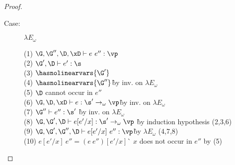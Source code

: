 \begin{proof}
\begin{description}
\item[Case:] $\lambda E_\omega$
\begin{tabbing}
    (1) $\G, \G'', \D, \xD \vdash e~e'' : \vp$\\
    (2) $\G', \D \vdash e' : \s$\\
    (3) $\hasnolinearvars{\G'}$\\
    (4) $\hasnolinearvars{\G''}$\` by inv. on $\lambda E_\omega$\\
    (5) $\D$ cannot occur in $e''$\\
    (6) $\G, \D, \xD \vdash e : \s' \to_\omega \vp$\` by inv. on $\lambda E_\omega$\\
    (7) $\G'' \vdash e'' : \s'$ \` by inv. on $\lambda E_\omega$\\
    (8) $\G, \G', \D \vdash e[e'/x] : \s' \to_\omega \vp$ \` by induction hypothesis (2,3,6)\\
    (9) $\G, \G', \G'', \D \vdash e[e'/x]~e'' : \vp$\` by $\lambda E_\omega$ (4,7,8)\\
    (10) $e[e'/x]~e'' = (e~e'')[e'/x]$\` $x$ does not occur in $e''$ by (5)\\
\end{tabbing}


\end{description}

\end{proof}

